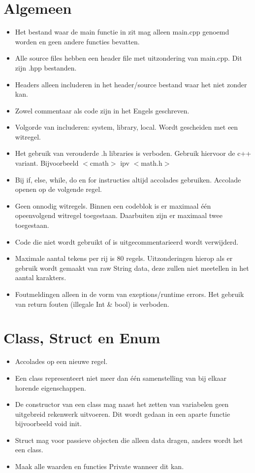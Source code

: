 \documentclass[a4paper, 11pt, oneside]{report}
\begin{document}
\section{Algemeen}

\begin{itemize}
\item Het bestand waar de main functie in zit mag alleen main.cpp genoemd worden en geen andere functies bevatten.
\item Alle source files hebben een header file met uitzondering van main.cpp. Dit zijn .hpp bestanden.
\item Headers alleen includeren in het header/source bestand waar het niet zonder kan.
\item Zowel commentaar als code zijn in het Engels geschreven.
\item Volgorde van includeren: system, library, local. Wordt gescheiden met een witregel.
\item Het gebruik van verouderde .h libraries is verboden. Gebruik hiervoor de c++ variant. Bijvoorbeeld $<$cmath$>$ ipv $<$math.h$>$
\item Bij if, else, while, do en for instructies altijd accolades gebruiken. Accolade openen op de volgende regel.
\item Geen onnodig witregels. Binnen een codeblok is er maximaal één opeenvolgend witregel toegestaan. Daarbuiten zijn er maximaal twee toegestaan.
\item Code die niet wordt gebruikt of is uitgecommentarieerd wordt verwijderd.
\item Maximale aantal tekens per rij is 80 regels. Uitzonderingen hierop als er gebruik wordt gemaakt van raw String data, deze zullen niet meetellen in het aantal karakters.
\item Foutmeldingen alleen in de vorm van exeptions/runtime errors. Het gebruik van return fouten (illegale Int \& bool) is verboden.
\end{itemize}

\section{Class, Struct en Enum}
\begin{itemize}
\item Accolades op een nieuwe regel.
\item Een class representeert niet meer dan één samenstelling van bij elkaar horende eigenschappen.
\item De constructor van een class mag naast het zetten van variabelen geen uitgebreid rekenwerk uitvoeren. Dit wordt gedaan in een aparte functie bijvoorbeeld void init.
\item Struct mag voor passieve objecten die alleen data dragen, anders wordt het een class.
\item Maak alle waarden en functies Private wanneer dit kan.
\end{itemize}
\end{document}
